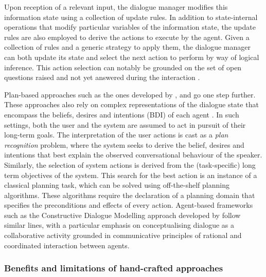 Upon reception of a relevant input, the dialogue manager modifies this information state using a collection of update rules. In addition to state-internal operations that modify particular variables of the information state, the update rules are also employed to derive the actions to execute by the agent.  Given a collection of rules and a generic strategy to apply them, the dialogue manager can both update its state and select the next action to perform by way of logical inference. This action selection can notably be grounded on the set of open questions raised and not yet answered during the interaction \citep{larsson2002,Ginzburg2012}.  

Plan-based approaches such as the ones developed by \cite{Freedman:2000}, \cite{RichSidner98umuai} and \cite{Allen:2000:AGD:973935.973937} go one step further. These approaches also rely on complex representations of the dialogue state that encompass the beliefs, desires and intentions (BDI) of each agent \citep{Cohen1979,Allen1980}.  In such settings, both the user and the system are assumed to act in pursuit of their long-term goals.  The interpretation of the user actions is cast as a \textit{plan recognition} problem, where the system seeks to derive the belief, desires and intentions that best explain the observed conversational behaviour of the speaker.  Similarly, the selection of system actions is derived from the (task-specific) long term objectives of the system. This search for the best action is an instance of a classical planning task, which can be solved using off-the-shelf planning algorithms. These algorithms require the declaration of a planning domain that specifies the preconditions and effects of every action. Agent-based frameworks such as the Constructive Dialogue Modelling approach developed by \cite{Jokinen:2009} follow similar lines, with a particular emphasis on conceptualising dialogue as a collaborative activity grounded in communicative principles of rational and coordinated interaction between agents. 

\subsubsection*{Benefits and limitations of hand-crafted approaches}

